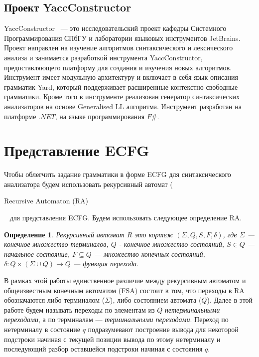 \documentclass[14pt]{matmex-diploma-custom}
\newtheorem{mydef}{Определение}
\begin{document}
    \subsection{Проект YaccConstructor}
    YaccConstructor~\cite{YaccConstructor} --- это исследовательский проект кафедры Системного Программирования СПбГУ и лаборатории
    языковых инструментов JetBrains. Проект направлен на изучение алгоритмов синтаксического и 
    лексического анализа и занимается разработкой инструмента YaccConstructor, предоставляющего платформу для
    создания и изучения новых алгоритмов. Инструмент имеет модульную архитектуру и включает в себя язык описания 
    грамматик Yard, который поддерживает расширенные контекстно-свободные грамматики. Кроме того в инструменте 
    реализован генератор синтаксических анализаторов на основе Generalised LL алгоритма.
    Инструмент разработан на платформе $.NET$, на языке программирования $F\#$.
    
	\section{Представление ECFG}
	
	Чтобы облегчить задание грамматики в форме ECFG для синтаксического анализатора
	будем использовать рекурсивный автомат (\begin{english} Recursive Automaton (RA)\end{english}~\cite{tellier2006learning}
	для представления ECFG. Будем использовать следующее определение RA.
	\begin{mydef}
		Рекурсивный автомат $R$ это кортеж $(\Sigma, Q, S, F, \delta)$, где $\Sigma$
		--- конечное множество терминалов, $Q$ - конечное множество состояний, $S \in Q$ 
		--- начальное состояние, $F \subseteq Q$ --- множество конечных состояний,
		$\delta : Q \times (\Sigma \cup Q) \to Q$ --- функция перехода.
	\end{mydef}
	В рамках этой работы единственное различие между рекурсивным автоматом и общеизвестным
	конечным автоматом (FSA) состоит в том, что переходы в RA обозначаются либо терминалом ($\Sigma$),
	либо состоянием автомата ($Q$). Далее в этой работе будем называть переходы по элементам из
	$Q$ \textit{нетерминальными переходами}, а по терминалам --- \textit{терминальными переходами}.
    Переход по нетерминалу в состояние $q$ подразумевают построение вывода для некоторой подстроки начиная с текущей позиции
    вывода по этому нетерминалу и последующий разбор оставшейся подстроки начиная с состояния $q$.
     
\end{document}
